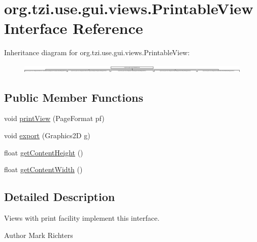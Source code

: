 \hypertarget{interfaceorg_1_1tzi_1_1use_1_1gui_1_1views_1_1_printable_view}{\section{org.\-tzi.\-use.\-gui.\-views.\-Printable\-View Interface Reference}
\label{interfaceorg_1_1tzi_1_1use_1_1gui_1_1views_1_1_printable_view}
}
Inheritance diagram for org.\-tzi.\-use.\-gui.\-views.\-Printable\-View\-:\begin{figure}[H]
\begin{center}
\leavevmode
\includegraphics[height=0.414048cm]{interfaceorg_1_1tzi_1_1use_1_1gui_1_1views_1_1_printable_view}
\end{center}
\end{figure}
\subsection*{Public Member Functions}
\begin{DoxyCompactItemize}
\item 
void \hyperlink{interfaceorg_1_1tzi_1_1use_1_1gui_1_1views_1_1_printable_view_a8dcf2de9e7bb1dd34e3378ed76eadee9}{print\-View} (Page\-Format pf)
\item 
void \hyperlink{interfaceorg_1_1tzi_1_1use_1_1gui_1_1views_1_1_printable_view_a6c991a71ecde8e42d5b5191a1109d9bd}{export} (Graphics2\-D g)
\item 
float \hyperlink{interfaceorg_1_1tzi_1_1use_1_1gui_1_1views_1_1_printable_view_a882cdfa177673871fee2025c185327a1}{get\-Content\-Height} ()
\item 
float \hyperlink{interfaceorg_1_1tzi_1_1use_1_1gui_1_1views_1_1_printable_view_a2d2447214340e882fc3b22b189598984}{get\-Content\-Width} ()
\end{DoxyCompactItemize}


\subsection{Detailed Description}
Views with print facility implement this interface.

\begin{DoxyAuthor}{Author}
Mark Richters 
\end{DoxyAuthor}


